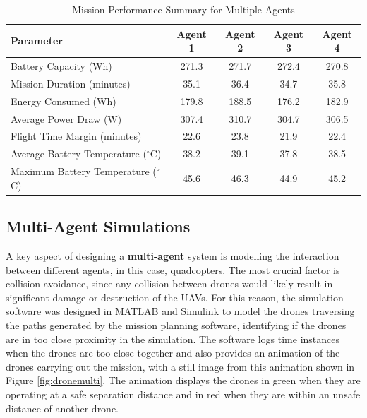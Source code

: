 \begin{table}[H]
\centering
\begin{tabular}{@{}lcccc}
\toprule
\textbf{Parameter}                & \textbf{Agent 1}  & \textbf{Agent 2}  & \textbf{Agent 3}  & \textbf{Agent 4} \\ \midrule
Battery Capacity (Wh)             & 271.3             & 271.7             & 272.4             & 270.8             \\
Mission Duration (minutes)        & 35.1              & 36.4              & 34.7              & 35.8              \\
Energy Consumed (Wh)              & 179.8             & 188.5             & 176.2             & 182.9             \\
Average Power Draw (W)            & 307.4             & 310.7             & 304.7             & 306.5             \\
Flight Time Margin (minutes)      & 22.6              & 23.8              & 21.9              & 22.4              \\
Average Battery Temperature ($^\circ$C) & 38.2              & 39.1              & 37.8              & 38.5              \\
Maximum Battery Temperature ($^\circ$C)    & 45.6              & 46.3              & 44.9              & 45.2              \\
\bottomrule
\end{tabular}
\caption{Mission Performance Summary for Multiple Agents}
\label{tab:mission_summary_extended}
\end{table}

\subsection{Multi-Agent Simulations}

A key aspect of designing a \textbf{multi-agent} system is modelling the interaction between different agents, in this case, quadcopters. The most crucial factor is collision avoidance, since any collision between drones would likely result in significant damage or destruction of the \gls{UAV}s. For this reason, the simulation software was designed in MATLAB and Simulink to model the drones traversing the paths generated by the mission planning software, identifying if the drones are in too close proximity in the simulation. The software logs time instances when the drones are too close together and also provides an animation of the drones carrying out the mission, with a still image from this animation shown in Figure \ref{fig:dronemulti}. The animation displays the drones in green when they are operating at a safe separation distance and in red when they are within an unsafe distance of another drone. 


